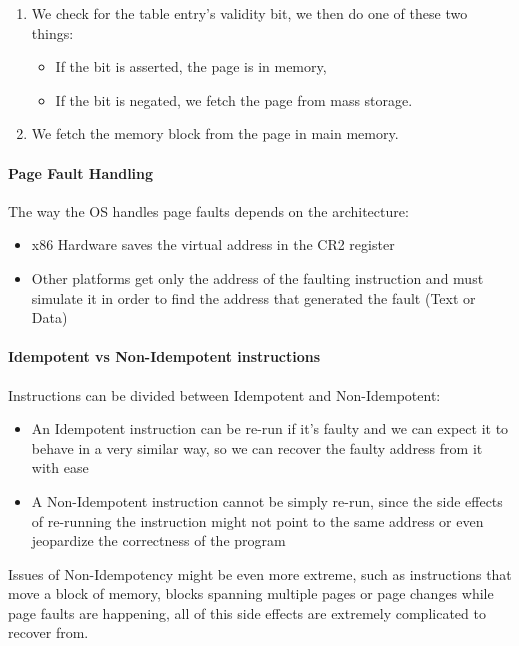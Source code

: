 \documentclass[openright, twoside]{report}
\theoremstyle{definition}
\theoremstyle{example}
\begin{document}
\begin{enumerate}
	\item We check for the table entry's validity bit, we then do one of these two things:
	\begin{itemize}
		\item If the bit is asserted, the page is in memory,
		\item If the bit is negated, we fetch the page from mass storage.
	\end{itemize}
	\item We fetch the memory block from the page in main memory.
\end{enumerate}

\paragraph{Page Fault Handling}
The way the OS handles page faults depends on the architecture:
\begin{itemize}
	\item x86 Hardware saves the virtual address in the CR2 register
	\item Other platforms get only the address of the faulting instruction 
	and must simulate it in order to find the address that generated the fault (Text or Data)
\end{itemize}
			 
\paragraph{Idempotent vs Non-Idempotent instructions}

Instructions can be divided between Idempotent and Non-Idempotent:
\begin{itemize}
	\item An Idempotent instruction can be re-run if it's faulty and we can expect it to 
	behave in a very similar way, so we can recover the faulty address from it with ease
	\item A Non-Idempotent instruction cannot be simply re-run, since the side effects of 
	re-running the instruction might not point to the same address or even
	jeopardize the correctness of the program
\end{itemize}

Issues of Non-Idempotency might be even more extreme, such as instructions that move a block 
of memory, blocks spanning multiple pages or page changes while page faults are happening, 
all of this side effects are extremely complicated to recover from.
\end{document}
